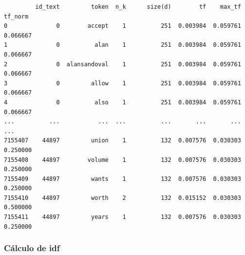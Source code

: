 \documentclass[
  11pt,
  a4paper,
]{article}
\begin{document}
\begin{verbatim}
         id_text         token  n_k      size(d)        tf    max_tf   tf_norm
0              0        accept    1          251  0.003984  0.059761  0.066667
1              0          alan    1          251  0.003984  0.059761  0.066667
2              0  alansandoval    1          251  0.003984  0.059761  0.066667
3              0         allow    1          251  0.003984  0.059761  0.066667
4              0          also    1          251  0.003984  0.059761  0.066667
...          ...           ...  ...          ...       ...       ...       ...
7155407    44897         union    1          132  0.007576  0.030303  0.250000
7155408    44897        volume    1          132  0.007576  0.030303  0.250000
7155409    44897         wants    1          132  0.007576  0.030303  0.250000
7155410    44897         worth    2          132  0.015152  0.030303  0.500000
7155411    44897         years    1          132  0.007576  0.030303  0.250000
\end{verbatim}

\hypertarget{cuxe1lculo-de-idf}{%
\subsubsection{Cálculo de idf}\label{cuxe1lculo-de-idf}}
\end{document}
